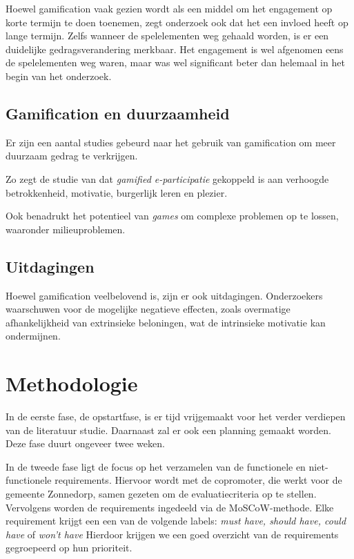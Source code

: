 \documentclass{hogent-article}
\begin{document}
Hoewel gamification vaak gezien wordt als een middel om het engagement op korte termijn te doen toenemen, zegt onderzoek ook dat het een invloed heeft op lange termijn. Zelfs wanneer de spelelementen weg gehaald worden, is er een duidelijke gedragsverandering merkbaar. Het engagement is wel afgenomen eens de spelelementen weg waren, maar was wel significant beter dan helemaal in het begin van het onderzoek. \autocite{Li_2024}

\subsection{Gamification en duurzaamheid}
Er zijn een aantal studies gebeurd naar het gebruik van gamification om meer duurzaam gedrag te verkrijgen. 

Zo zegt de studie van \textcite{Hassan_2020} dat \textit{gamified e-participatie} gekoppeld is aan verhoogde betrokkenheid, motivatie, burgerlijk leren en plezier.

Ook \textcite{McConigal2011} benadrukt het potentieel van \emph{games} om complexe problemen op te lossen, waaronder milieuproblemen.

\subsection{Uitdagingen}
Hoewel gamification veelbelovend is, zijn er ook uitdagingen. Onderzoekers waarschuwen voor de mogelijke negatieve effecten, zoals overmatige afhankelijkheid van extrinsieke beloningen, wat de intrinsieke motivatie kan ondermijnen. \autocite{Buznea2021}


\section{Methodologie}%
\label{sec:methodologie}

In de eerste fase, de opstartfase, is er tijd vrijgemaakt voor het verder verdiepen van de literatuur studie. Daarnaast zal er ook een planning gemaakt worden. Deze fase duurt ongeveer twee weken.

In de tweede fase ligt de focus op het verzamelen van de functionele en niet-functionele requirements. Hiervoor wordt met de copromoter, die werkt voor de gemeente Zonnedorp, samen gezeten om de evaluatiecriteria op te stellen. Vervolgens worden de requirements ingedeeld via de MoSCoW-methode. Elke requirement krijgt een een van de volgende labels: \emph{must have, should have, could have} of \emph{won't have} Hierdoor krijgen we een goed overzicht van de requirements gegroepeerd op hun prioriteit.
\end{document}
